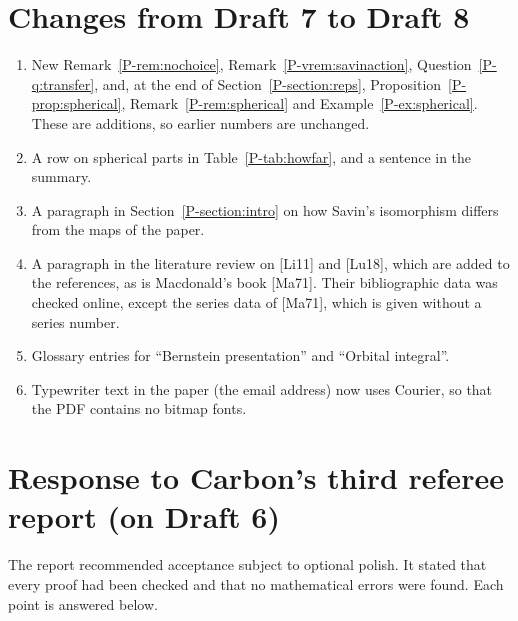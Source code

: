 \documentclass[12pt,letterpaper]{amsart}
\begin{document}
\section{Changes from Draft 7 to Draft 8}
\label{sec:d7d8}

\begin{enumerate}[leftmargin=1.5em]
\item New Remark~\ref{P-rem:nochoice}, Remark~\ref{P-vrem:savinaction},
Question~\ref{P-q:transfer}, and, at the end of
Section~\ref{P-section:reps}, Proposition~\ref{P-prop:spherical},
Remark~\ref{P-rem:spherical} and Example~\ref{P-ex:spherical}. These
are additions, so earlier numbers are unchanged.
\item A row on spherical parts in Table~\ref{P-tab:howfar}, and a
sentence in the summary.
\item A paragraph in Section~\ref{P-section:intro} on how Savin's
isomorphism differs from the maps of the paper.
\item A paragraph in the literature review on [Li11] and [Lu18], which
are added to the references, as is Macdonald's book [Ma71]. Their
bibliographic data was checked online, except the series data of
[Ma71], which is given without a series number.
\item Glossary entries for ``Bernstein presentation'' and ``Orbital
integral''.
\item Typewriter text in the paper (the email address) now uses
Courier, so that the PDF contains no bitmap fonts.
\end{enumerate}

\section{Response to Carbon's third referee report (on Draft 6)}
\label{sec:referee3}

The report recommended acceptance subject to optional polish. It stated
that every proof had been checked and that no mathematical errors were
found. Each point is answered below.
\end{document}
